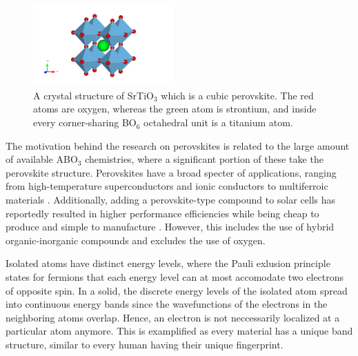 \begin{figure}
  \centering
  \includegraphics[width=0.48\textwidth]{theory/figures/SrTiO3_mp-5229_primitive.pdf}
  \caption{A crystal structure of SrTiO$_3$ which is a cubic perovskite. The red atoms are oxygen, whereas the green atom is strontium, and inside every corner-sharing BO$_6$ octahedral unit is a titanium atom.}
  \label{fig:perovskite}
\end{figure}

The motivation behind the research on perovskites is related to the large amount of available ABO$_3$ chemistries, where a significant portion of these take the perovskite structure. Perovskites have a broad specter of applications, ranging from high-temperature superconductors \cite{Bednorz1988} and ionic conductors \cite{Boivin1998} to multiferroic materials \cite{Cheong2007}. Additionally, adding a perovskite-type compound to solar cells has reportedly resulted in higher performance efficiencies while being cheap to produce and simple to manufacture \cite{IbnMohammed2017, Chen2014}. However, this includes the use of hybrid organic-inorganic compounds and excludes the use of oxygen.




Isolated atoms have distinct energy levels, where the Pauli exlusion principle \cite{Pauli1925} states for fermions that each energy level can at most accomodate two electrons of opposite spin. In a solid, the discrete energy levels of the isolated atom spread into continuous energy bands since the wavefunctions of the electrons in the neighboring atoms overlap. Hence, an electron is not neccessarily localized at a particular atom anymore. This is examplified as every material has a unique band structure, similar to every human having their unique fingerprint.


